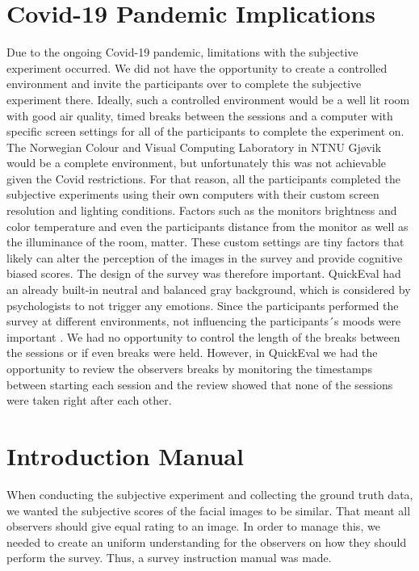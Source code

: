 \section{Covid-19 Pandemic Implications}
Due to the ongoing Covid-19 pandemic, limitations with the subjective experiment occurred. We did not have the opportunity to create a controlled environment and invite the participants over to complete the subjective experiment there. Ideally, such a controlled environment would be a well lit room with good air quality, timed breaks between the sessions and a computer with specific screen settings for all of the participants to complete the experiment on. The Norwegian Colour and Visual Computing Laboratory in NTNU Gjøvik would be a complete environment, but unfortunately this was not achievable given the Covid restrictions. For that reason, all the participants completed the subjective experiments using their own computers with their custom screen resolution and lighting conditions. Factors such as the monitors brightness and color temperature and even the participants distance from the monitor as well as the illuminance of the room, matter. These custom settings are tiny factors that likely can alter the perception of the images in the survey and provide cognitive biased scores. The design of the survey was therefore important. QuickEval had an already built-in neutral and balanced gray background, which is considered by psychologists to not trigger any emotions. Since the participants performed the survey at different environments, not influencing the participants´s moods were important \cite{grayBackground}. We had no opportunity to control the length of the breaks between the sessions or if even breaks were held. However, in QuickEval we had the opportunity to review the observers breaks by monitoring the timestamps between starting each session and the review showed that none of the sessions were taken right after each other.  

\section{Introduction Manual}
\label{sec:intromanual}
When conducting the subjective experiment and collecting the ground truth data, we wanted the subjective scores of the facial images to be similar. That meant all observers should give equal rating to an image. In order to manage this, we needed to create an uniform understanding for the observers on how they should perform the survey. Thus, a survey instruction manual was made. 

